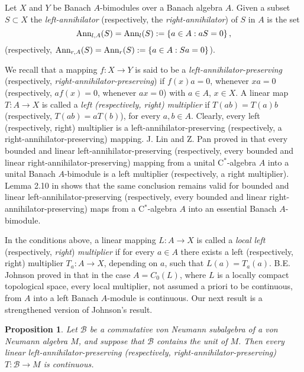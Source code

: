 \documentclass[11pt]{amsart}
\newtheorem{proposition}[theorem]{Proposition}
\begin{document}
Let $X$ and $Y$ be Banach $A$-bimodules over a Banach algebra $A$. Given a subset $S\subset X$ the \emph{left-annihilator} (respectively, the \emph{right-annihilator}) of $S$ in $A$ is the set $$\hbox{Ann}_{l,A} (S)= \hbox{Ann}_{l} (S)  := \left\{ a\in A : a S = 0 \right\},$$ (respectively, $\hbox{Ann}_{r,A} (S)= \hbox{Ann}_{r} (S)  := \left\{ a\in A : S a = 0 \right\}$).\smallskip

We recall that a mapping $f: X\to Y$ is said to be a \emph{left-annihilator-preserving} (respectively, \emph{right-annihilator-preserving}) if $f(x) a=0$, whenever $x a=0$ (respectively, $a f(x)=0$, whenever $ a x=0$) with $a\in A$, $x\in X$. A linear map $T: A\to X$ is called a \emph{left (respectively, right) multiplier} if $T (ab) = T (a)b$ (respectively, $T (ab) = a T (b)$), for every $a,b\in A$. Clearly, every left (respectively, right) multiplier is a left-annihilator-preserving (respectively, a right-annihilator-preserving) mapping. J. Lin and Z. Pan proved in \cite[Theorem 2.8]{LiPan} that every bounded and linear left-annihilator-preserving (respectively, every bounded and linear right-annihilator-preserving) mapping from a unital C$^*$-algebra $A$ into a unital Banach $A$-bimodule is a  left multiplier (respectively, a right multiplier). Lemma 2.10 in \cite{AyuKudPe2014} shows that the same conclusion remains valid for bounded and linear left-annihilator-preserving (respectively, every bounded and linear right-annihilator-preserving) maps from a C$^*$-algebra $A$ into an essential Banach $A$-bimodule.\smallskip

In the conditions above, a linear mapping $L:A \to X$ is called a \emph{local left}  (respectively, \emph{right}) \emph{multiplier} if for every $a\in A$ there exists a left  (respectively, right) multiplier $T_{a}: A\to X$, depending on $a$, such that $L(a) = T_a (a)$. B.E. Johnson proved in \cite[Proposition 7.2]{John01} that in the case $A= C_0 (L)$, where $L$ is a locally compact topological space, every local multiplier, not assumed a priori to be continuous, from $A$ into a left Banach $A$-module is continuous. Our next result is a strengthened version of Johnson's result.

\begin{proposition}\label{p Johnson continuity left-annihilator-preserving on abelian von Neumann} Let $\mathcal{B}$ be a commutative von Neumann subalgebra of a von Neumann algebra $M$, and suppose that $\mathcal{B}$ contains the unit of $M$. Then every linear left-annihilator-preserving {\rm(}respectively, \emph{right-annihilator-preserving}{\rm)} $T: \mathcal{B} \to M$ is continuous.
\end{proposition}
\end{document}
